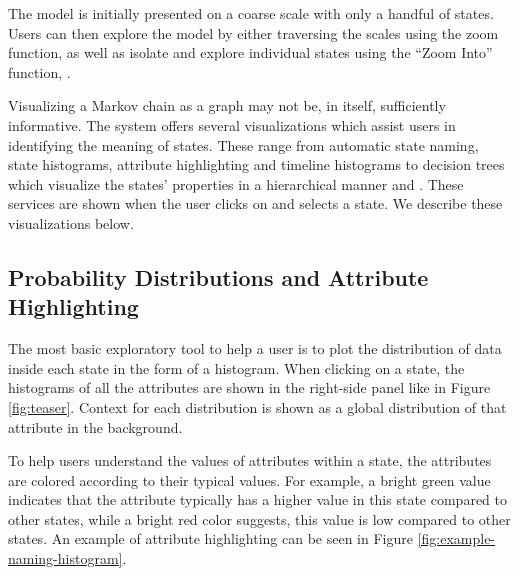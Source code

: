 The model is initially presented on a coarse scale with only a handful
of states. Users can then explore the model by either traversing the scales using the zoom 
function, as well as isolate and explore individual states using the ``Zoom Into'' function, .

Visualizing a Markov chain as a graph may not be, in itself,  sufficiently informative. The system offers several 
visualizations which assist users in identifying the meaning of states. These range from automatic
state naming, state histograms, attribute highlighting and timeline histograms to decision trees
which visualize the states' properties in a hierarchical manner and .
These services are shown when the user clicks on and selects a state. We describe these visualizations below.  




\subsection{Probability Distributions and Attribute Highlighting}

The most basic exploratory tool to help a user is to plot the distribution of data inside each state in the form of a histogram. When clicking on a state, the histograms of all the attributes are shown in the right-side panel like in Figure \ref{fig:teaser}. Context for each distribution is shown as a global distribution of that attribute in the background.

%
To help users understand the  values of attributes within a state, the attributes are colored according to their typical values.  For example, a bright green
value indicates that the attribute typically  has a higher value in this state compared to other states, while
a bright red color suggests, this value is low compared to other states. An example of attribute 
highlighting can be seen in Figure \ref{fig:example-naming-histogram}.


